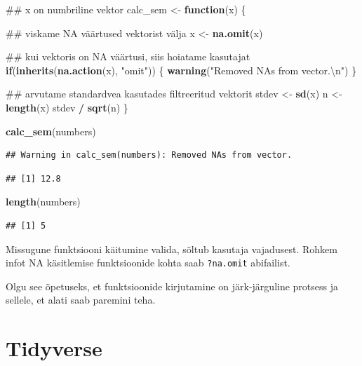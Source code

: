 \documentclass[]{book}
\newenvironment{Shaded}{\begin{snugshade}}{\end{snugshade}}
\newcommand{\KeywordTok}[1]{\textcolor[rgb]{0.13,0.29,0.53}{\textbf{#1}}}
\newcommand{\CharTok}[1]{\textcolor[rgb]{0.31,0.60,0.02}{#1}}
\newcommand{\StringTok}[1]{\textcolor[rgb]{0.31,0.60,0.02}{#1}}
\newcommand{\ControlFlowTok}[1]{\textcolor[rgb]{0.13,0.29,0.53}{\textbf{#1}}}
\newcommand{\OperatorTok}[1]{\textcolor[rgb]{0.81,0.36,0.00}{\textbf{#1}}}
\newcommand{\NormalTok}[1]{#1}
\begin{document}
\begin{Shaded}
\begin{Highlighting}[]
\NormalTok{## x on numbriline vektor}
\NormalTok{calc_sem <-}\StringTok{ }\ControlFlowTok{function}\NormalTok{(x) \{}
  
\NormalTok{  ## viskame NA väärtused vektorist välja}
\NormalTok{  x <-}\StringTok{ }\KeywordTok{na.omit}\NormalTok{(x)}
  
\NormalTok{  ## kui vektoris on NA väärtusi, siis hoiatame kasutajat}
  \ControlFlowTok{if}\NormalTok{(}\KeywordTok{inherits}\NormalTok{(}\KeywordTok{na.action}\NormalTok{(x), }\StringTok{"omit"}\NormalTok{)) \{}
    \KeywordTok{warning}\NormalTok{(}\StringTok{"Removed NAs from vector.}\CharTok{\textbackslash{}n}\StringTok{"}\NormalTok{)}
\NormalTok{  \}}
  
\NormalTok{  ## arvutame standardvea kasutades filtreeritud vektorit}
\NormalTok{  stdev <-}\StringTok{ }\KeywordTok{sd}\NormalTok{(x)}
\NormalTok{  n <-}\StringTok{ }\KeywordTok{length}\NormalTok{(x)}
\NormalTok{  stdev }\OperatorTok{/}\StringTok{ }\KeywordTok{sqrt}\NormalTok{(n)}
\NormalTok{\}}

\KeywordTok{calc_sem}\NormalTok{(numbers)}
\end{Highlighting}
\end{Shaded}

\begin{verbatim}
## Warning in calc_sem(numbers): Removed NAs from vector.
\end{verbatim}

\begin{verbatim}
## [1] 12.8
\end{verbatim}

\begin{Shaded}
\begin{Highlighting}[]
\KeywordTok{length}\NormalTok{(numbers)}
\end{Highlighting}
\end{Shaded}

\begin{verbatim}
## [1] 5
\end{verbatim}

Missugune funktsiooni käitumine valida, sõltub kasutaja vajadusest.
Rohkem infot NA käsitlemise funktsioonide kohta saab \texttt{?na.omit}
abifailist.

Olgu see õpetuseks, et funktsioonide kirjutamine on järk-järguline
protsess ja sellele, et alati saab paremini teha.

\chapter{Tidyverse}\label{tidyverse}
\end{document}

